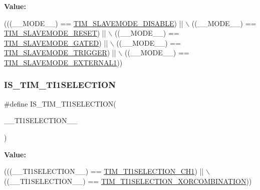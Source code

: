 {\bfseries Value\+:}
\begin{DoxyCode}
(((\_\_MODE\_\_) == \hyperlink{group___t_i_m___slave___mode_ga3b53e1a85d08f125df4371f86bdaf79b}{TIM\_SLAVEMODE\_DISABLE})   || \(\backslash\)
                                     ((\_\_MODE\_\_) == \hyperlink{group___t_i_m___slave___mode_ga9f28e350c0560dc550f5c0d2f8b39ba7}{TIM\_SLAVEMODE\_RESET})     || \(\backslash\)
                                     ((\_\_MODE\_\_) == \hyperlink{group___t_i_m___slave___mode_ga4501317fcd7649e5ff46db6fe69938e0}{TIM\_SLAVEMODE\_GATED})     || \(\backslash\)
                                     ((\_\_MODE\_\_) == \hyperlink{group___t_i_m___slave___mode_ga12f8f7b4a16b438f54cf811f0bb0a8a4}{TIM\_SLAVEMODE\_TRIGGER})   || \(\backslash\)
                                     ((\_\_MODE\_\_) == \hyperlink{group___t_i_m___slave___mode_ga90dcf32a66dcb250b18da2ff56471328}{TIM\_SLAVEMODE\_EXTERNAL1}))
\end{DoxyCode}
\mbox{\label{group___t_i_m___private___macros_ga6198cc86401c7b2ca26f5074847cda13}} 
\subsubsection{\texorpdfstring{I\+S\+\_\+\+T\+I\+M\+\_\+\+T\+I1\+S\+E\+L\+E\+C\+T\+I\+ON}{IS\_TIM\_TI1SELECTION}}
{\footnotesize\ttfamily \#define I\+S\+\_\+\+T\+I\+M\+\_\+\+T\+I1\+S\+E\+L\+E\+C\+T\+I\+ON(\begin{DoxyParamCaption}\item[{}]{\+\_\+\+\_\+\+T\+I1\+S\+E\+L\+E\+C\+T\+I\+O\+N\+\_\+\+\_\+ }\end{DoxyParamCaption})}

{\bfseries Value\+:}
\begin{DoxyCode}
(((\_\_TI1SELECTION\_\_) == \hyperlink{group___t_i_m___t_i1___selection_gace6563bccf7635461f660fbed6241488}{TIM\_TI1SELECTION\_CH1}) || \(\backslash\)
                                                ((\_\_TI1SELECTION\_\_) == 
      \hyperlink{group___t_i_m___t_i1___selection_ga40dfcb0e3f2fdf0f45cbba227106310a}{TIM\_TI1SELECTION\_XORCOMBINATION}))
\end{DoxyCode}
\mbox{\label{group___t_i_m___private___macros_ga9c59624b1c4a60f39385da551ab31e53}} 

